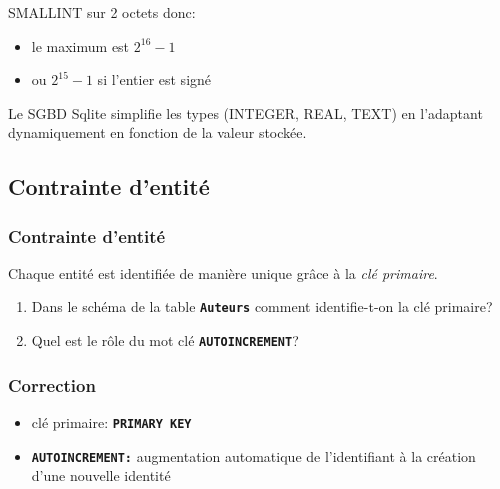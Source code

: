 \documentclass[svgnames,11pt]{beamer}
\begin{document}
\begin{frame}
    \frametitle{}

    SMALLINT sur 2 octets donc:
    \begin{itemize}
        \item le maximum est $2^{16}-1$
        \item ou $2^{15}-1$ si l'entier est signé
    \end{itemize}
\begin{aretenir}[Remarque]
    Le SGBD Sqlite simplifie les types (INTEGER, REAL, TEXT) en l'adaptant dynamiquement en fonction de la valeur stockée.
\end{aretenir}
\end{frame}
\subsection{Contrainte d'entité}
\begin{frame}
    \frametitle{Contrainte d'entité}

    Chaque entité est identifiée de manière unique grâce à la \emph{clé primaire}.
    \begin{activite}
    \begin{enumerate}
    \item Dans le schéma de la table \texttt{\textbf{Auteurs}} comment identifie-t-on la clé primaire?
    \item Quel est le rôle du mot clé \texttt{\textbf{AUTOINCREMENT}}?
    \end{enumerate}
    \end{activite}

\end{frame}
\begin{frame}
    \frametitle{Correction}

    \begin{itemize}
        \item clé primaire: \texttt{\textbf{PRIMARY KEY}}
        \item \texttt{\textbf{AUTOINCREMENT:}} augmentation automatique de l'identifiant à la création d'une nouvelle identité
    \end{itemize}

\end{frame}
\end{document}
